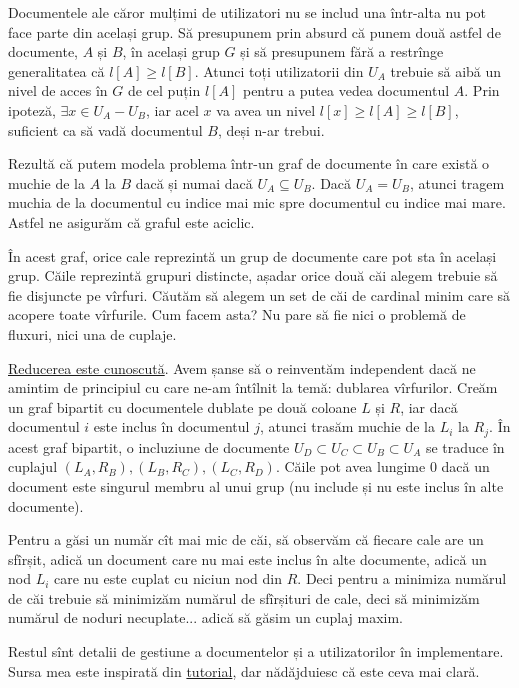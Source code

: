 \documentclass[../main.tex]{subfiles}
\begin{document}
Documentele ale căror mulțimi de utilizatori nu se includ una într-alta nu pot face parte din același grup. Să presupunem prin absurd că punem două astfel de documente, $A$ și $B$, în același grup $G$ și să presupunem fără a restrînge generalitatea că $l[A] \geq l[B]$. Atunci toți utilizatorii din $U_A$ trebuie să aibă un nivel de acces în $G$ de cel puțin $l[A]$ pentru a putea vedea documentul $A$. Prin ipoteză, $\exists x \in U_A - U_B$, iar acel $x$ va avea un nivel $l[x] \geq l[A] \geq l[B]$, suficient ca să vadă documentul $B$, deși n-ar trebui.

Rezultă că putem modela problema într-un graf de documente în care există o muchie de la $A$ la $B$ dacă și numai dacă $U_A \subseteq U_B$. Dacă $U_A = U_B$, atunci tragem muchia de la documentul cu indice mai mic spre documentul cu indice mai mare. Astfel ne asigurăm că graful este aciclic.

În acest graf, orice cale reprezintă un grup de documente care pot sta în același grup. Căile reprezintă grupuri distincte, așadar orice două căi alegem trebuie să fie disjuncte pe vîrfuri. Căutăm să alegem un set de căi de cardinal minim care să acopere toate vîrfurile. Cum facem asta? Nu pare să fie nici o problemă de fluxuri, nici una de cuplaje.

\href{https://en.wikipedia.org/wiki/Maximum_flow_problem#Minimum_path_cover_in_directed_acyclic_graph}{Reducerea este cunoscută}. Avem șanse să o reinventăm independent dacă ne amintim de principiul cu care ne-am întîlnit la temă: dublarea vîrfurilor. Creăm un graf bipartit cu documentele dublate pe două coloane $L$ și $R$, iar dacă documentul $i$ este inclus în documentul $j$, atunci trasăm muchie de la $L_i$ la $R_j$. În acest graf bipartit, o incluziune de documente $U_D \subset U_C \subset U_B \subset U_A$ se traduce în cuplajul $(L_A, R_B), (L_B, R_C), (L_C, R_D)$. Căile pot avea lungime 0 dacă un document este singurul membru al unui grup (nu include și nu este inclus în alte documente).

Pentru a găsi un număr cît mai mic de căi, să observăm că fiecare cale are un sfîrșit, adică un document care nu mai este inclus în alte documente, adică un nod $L_i$ care nu este cuplat cu niciun nod din $R$. Deci pentru a minimiza numărul de căi trebuie să minimizăm numărul de sfîrșituri de cale, deci să minimizăm numărul de noduri necuplate... adică să găsim un cuplaj maxim.

Restul sînt detalii de gestiune a documentelor și a utilizatorilor în implementare. Sursa mea este inspirată din \href{https://codeforces.com/blog/entry/109642}{tutorial}, dar nădăjduiesc că este ceva mai clară.
\end{document}
